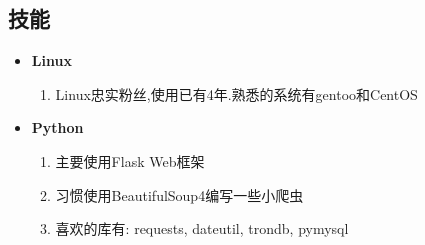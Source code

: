 \documentclass[11pt,letterpaper]{article}
\newcommand{\resitem}[1]{\item #1 \vspace{-2pt}}
\begin{document}
\begin{CJK}{UTF8}{gbsn}
\section{技能}
	\begin{itemize}
		\item
			\textbf{Linux}
			{ \footnotesize
			\begin{enumerate}
				\resitem{Linux忠实粉丝,使用已有4年.熟悉的系统有gentoo和CentOS}
			\end{enumerate}
			}
		\item
			\textbf{Python}
			{ \footnotesize
			\begin{enumerate}
				\resitem{主要使用Flask Web框架}
				\resitem{习惯使用BeautifulSoup4编写一些小爬虫}
				\resitem{喜欢的库有: requests, dateutil, trondb, pymysql}
			\end{enumerate}
			}
	\end{itemize}

\end{CJK} 
\end{document}
